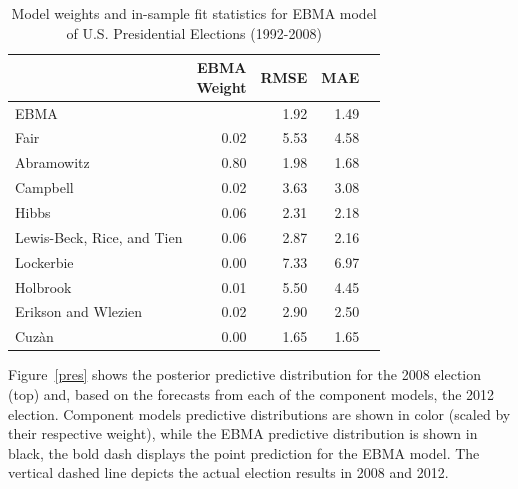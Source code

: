 \documentclass[12pt,fullpage,endnotes]{article}
\begin{document}
\begin{table}[ht]
\caption{Model weights and in-sample fit statistics for EBMA model of U.S. Presidential Elections (1992-2008)}
\label{presModel}
\begin{center}
\begin{tabular}{lrrrr}
  \toprule
 & \shortstack{EBMA\\ Weight}&RMSE &MAE \\ 
  \midrule
  EBMA &  & 1.92 & 1.49 \\ 
  Fair & 0.02 & 5.53 & 4.58 \\ 
  Abramowitz & 0.80 & 1.98 & 1.68 \\ 
  Campbell & 0.02 & 3.63 & 3.08 \\ 
  Hibbs & 0.06 & 2.31 & 2.18 \\ 
  Lewis-Beck, Rice, and Tien  & 0.06 & 2.87 & 2.16 \\ 
  Lockerbie & 0.00 & 7.33 & 6.97 \\ 
  Holbrook & 0.01 & 5.50 & 4.45 \\ 
  Erikson and Wlezien  & 0.02 & 2.90 & 2.50 \\ 
  Cuz\`an	 & 0.00 & 1.65 & 1.65 \\ 
  
   \bottomrule
\end{tabular}
\end{center}
\end{table}


Figure~\ref{pres} shows the posterior predictive distribution for the
2008 election (top) and, based on the forecasts from each of the
component models, the 2012 election.  Component models
predictive distributions are shown in color (scaled by their
respective weight), while the EBMA predictive distribution is shown in
black, the bold dash displays the point prediction for the EBMA model. The vertical dashed line depicts the actual election results in 2008 and 2012.
\end{document}
